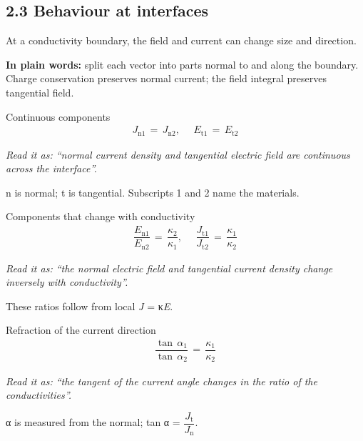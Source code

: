 \documentclass[11pt]{article}
\begin{document}
\begin{keepsection}
\section{2.3 Behaviour at interfaces}

At a conductivity boundary, the field and current can change size and direction.

\begin{plainbox}\textbf{In plain words:} split each vector into parts normal to and along the boundary. Charge conservation preserves normal current; the field integral preserves tangential field.\end{plainbox}

\begin{equationcard}{Continuous components}
\[ \begin{gathered} {J}_{\mathrm{n}1}\, =\, {J}_{\mathrm{n}2},\, \quad \, {E}_{\mathrm{t}1}\, =\, {E}_{\mathrm{t}2} \end{gathered} \]
{\small \emph{Read it as: “normal current density and tangential electric field are continuous across the interface”.}\par n is normal; t is tangential. Subscripts 1 and 2 name the materials.}
\end{equationcard}

\begin{equationcard}{Components that change with conductivity}
\[ \begin{gathered} \dfrac{{E}_{\mathrm{n}1}}{{E}_{\mathrm{n}2}}\, =\, \dfrac{κ_{2}}{κ_{1}},\, \quad \, \dfrac{{J}_{\mathrm{t}1}}{{J}_{\mathrm{t}2}}\, =\, \dfrac{κ_{1}}{κ_{2}} \end{gathered} \]
{\small \emph{Read it as: “the normal electric field and tangential current density change inversely with conductivity”.}\par These ratios follow from local \textit{J} = κ\textit{E}.}
\end{equationcard}

\begin{equationcard}{Refraction of the current direction}
\[ \begin{gathered} \dfrac{\tan \, α_{1}}{\tan \, α_{2}}\, =\, \dfrac{κ_{1}}{κ_{2}} \end{gathered} \]
{\small \emph{Read it as: “the tangent of the current angle changes in the ratio of the conductivities”.}\par α is measured from the normal; tan α = {\small\ensuremath{\dfrac{{J}_{\mathrm{t}}}{{J}_{\mathrm{n}}}}}.}
\end{equationcard}


\end{keepsection}
\end{document}
